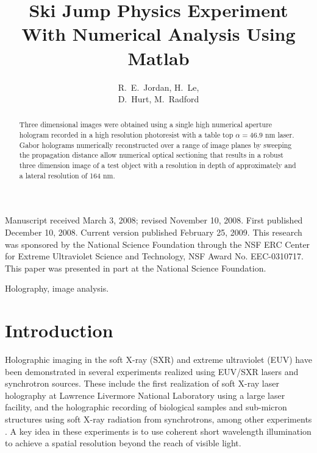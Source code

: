 \documentclass[]{IEEEphot}
\begin{document}
\title{Ski Jump Physics Experiment\\ With Numerical Analysis Using Matlab}

\author{R.~E.~Jordan, H.~Le,
\\
D.~Hurt, M.~Radford}


%

\maketitle


\begin{receivedinfo}%
Manuscript received March 3, 2008; revised November 10, 2008. First published December 10, 2008. Current version published February 25, 2009. This research was sponsored by the National Science Foundation through the NSF ERC Center for Extreme Ultraviolet Science and Technology, NSF Award No. EEC-0310717. This paper was presented in part at the National Science Foundation.
\end{receivedinfo}

\begin{abstract}
Three dimensional images were obtained using a single high numerical aperture hologram recorded in a high resolution photoresist with a table top $\alpha = 46.9$ nm laser. Gabor holograms numerically reconstructed over a range of image planes by sweeping the propagation distance allow numerical optical sectioning that results in a robust three dimension image of a test object with a resolution in depth of approximately and a lateral resolution of 164 nm. 
\end{abstract}

\begin{IEEEkeywords}
Holography, image analysis.
\end{IEEEkeywords}

\section{Introduction}

Holographic imaging in the soft X-ray (SXR) and extreme ultraviolet (EUV) have been demonstrated in several experiments realized using EUV/SXR lasers and synchrotron sources. These include the first realization of soft X-ray laser holography at Lawrence Livermore National Laboratory using a large laser facility, and the holographic recording of biological samples and sub-micron structures using soft X-ray radiation from synchrotrons, among other experiments \cite{Mizuuchi2002, Mizuuchi2003}.  A key idea in these experiments is to use coherent short wavelength illumination to achieve a spatial resolution beyond the reach of visible light.  
\end{document}
